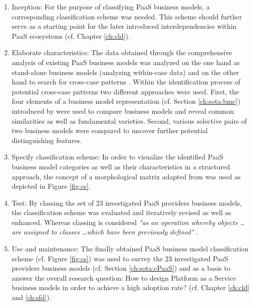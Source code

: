 \begin{enumerate}
	\item Inception: For the purpose of classifying \ac{PaaS} business models, a corresponding classification scheme was needed. This scheme should further serve as a starting point for the later introduced interdependencies within \ac{PaaS} ecosystems (cf. Chapter \ref{ch:cld}).

	\item Elaborate characteristics: The data obtained through the comprehensive analysis of existing \ac{PaaS} business models was analyzed on the one hand as stand-alone business models (analyzing within-case data) and on the other hand to search for cross-case patterns \citep[pp. 539-540]{Eisenhardt1989}. Within the identification process of potential cross-case patterns two different approaches were used. First, the four elements of a business model representation (cf. Section \ref{ch:sota:bmc}) introduced by \citet{Johnson2008} were used to compare business models and reveal common similarities as well as fundamental varieties. Second, various selective pairs of two business models were compared to uncover further potential distinguishing features. 

	\item Specify classification scheme: In order to visualize the identified \ac{PaaS} business model categories as well as their characteristics in a structured approach, the concept of a morphological matrix adapted from \citet{ Zwicky1969} was used as depicted in Figure \ref{fig:cs}.

	\item Test: By classing the set of 23 investigated \ac{PaaS} providers business models, the classification scheme was evaluated and iteratively revised as well as enhanced. Whereas classing is considered \textit{"as an operation whereby objects \ldots are assigned to classes \ldots which have been previously defined"} \citep[p. 130]{Marradi1990}.

	\item Use and maintenance: The finally obtained \ac{PaaS} business model classification scheme (cf. Figure \ref{fig:cs}) was used to survey the 23 investigated \ac{PaaS} providers business models (cf. Section \ref{ch:sota:cPaaS}) and as a basis to answer the overall research question: How to design Platform as a Service business models in order to achieve a high adoption rate? (cf. Chapter \ref{ch:cld} and \ref{ch:sfd}).
\end{enumerate}

